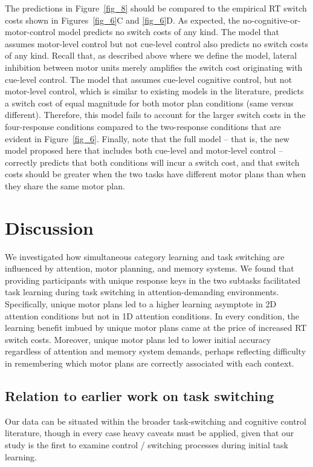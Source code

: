 \documentclass[doc, floatsintext]{apa7}
\begin{document}
The predictions in Figure~\ref{fig_8} should be compared to
the empirical RT switch costs shown in Figures~\ref{fig_6}C
and \ref{fig_6}D.  As expected, the
no-cognitive-or-motor-control model predicts no switch costs
of any kind.  The model that assumes motor-level control but
not cue-level control also predicts no switch costs of any
kind. Recall that, as described above where we define the
model, lateral inhibition between motor units merely
amplifies the switch cost originating with cue-level
control. The model that assumes cue-level cognitive control,
but not motor-level control, which is similar to existing
models in the literature, predicts a switch cost of equal
magnitude for both motor plan conditions (same versus
different).  Therefore, this model fails to account for the
larger switch costs in the four-response conditions compared
to the two-response conditions that are evident in
Figure~\ref{fig_6}.  Finally, note that the full model --
that is, the new model proposed here that includes both
cue-level and motor-level control -- correctly predicts that
both conditions will incur a switch cost, and that switch
costs should be greater when the two tasks have different
motor plans than when they share the same motor plan.

\section{Discussion}
We investigated how simultaneous category learning and task
switching are influenced by attention, motor planning, and
memory systems. We found that providing participants with
unique response keys in the two subtasks facilitated task
learning during task switching in attention-demanding
environments. Specifically, unique motor plans led to a
higher learning asymptote in 2D attention conditions but not
in 1D attention conditions. In every condition, the learning
benefit imbued by unique motor plans came at the price of
increased RT switch costs. Moreover, unique motor plans led
to lower initial accuracy regardless of attention and memory
system demands, perhaps reflecting difficulty in remembering
which motor plans are correctly associated with each
context.

\subsection{Relation to earlier work on task switching}
Our data can be situated within the broader task-switching
and cognitive control literature, though in every case heavy
caveats must be applied, given that our study is the first
to examine control / switching processes during initial task
learning.
\end{document}
